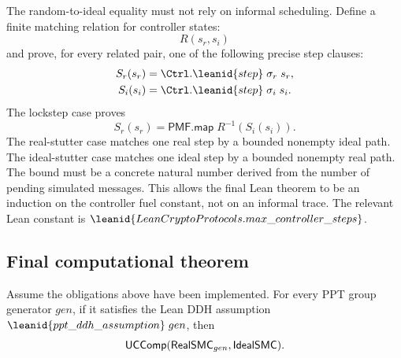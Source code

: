 \begin{obligation}
The random-to-ideal equality must not rely on informal scheduling.  Define a
finite matching relation for controller states:
\[
  R(s_r,s_i)
\]
and prove, for every related pair, one of the following precise step clauses:
\[
\begin{aligned}
  S_r(s_r)&=\Ctrl.\leanid{step}\;\sigma_r\;s_r,\\
  S_i(s_i)&=\Ctrl.\leanid{step}\;\sigma_i\;s_i .
\end{aligned}
\]
The lockstep case proves
\[
  S_r(s_r)=\mathsf{PMF.map}\;R^{-1}(S_i(s_i)).
\]
The real-stutter case matches one real step by a bounded nonempty ideal path.
The ideal-stutter case matches one ideal step by a bounded nonempty real path.
The bound must be a concrete natural number derived from the number of pending
simulated messages.  This allows the final Lean theorem to be an induction on
the controller fuel constant, not on an informal trace.  The relevant Lean
constant is \(\leanid{LeanCryptoProtocols.max\_controller\_steps}\).
\end{obligation}

\subsection{Final computational theorem}

\begin{theorem}
Assume the obligations above have been implemented.  For every PPT group
generator \(gen\), if it satisfies the Lean DDH assumption
\(\leanid{ppt\_ddh\_assumption}\;gen\), then
\[
  \mathsf{UCComp}(\mathsf{RealSMC}_{gen},\mathsf{IdealSMC}).
\]
\end{theorem}

